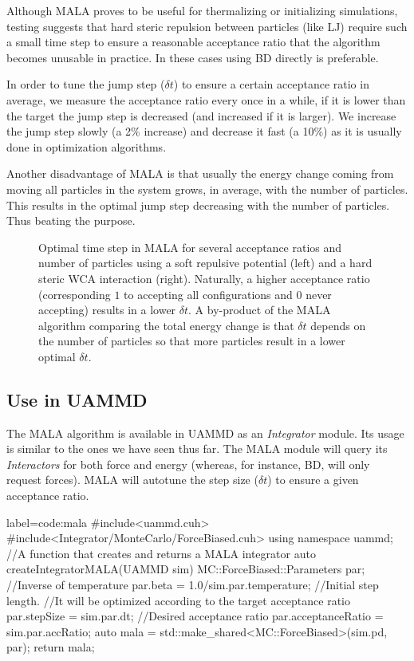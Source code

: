 \documentclass[ twoside,openright,titlepage,numbers=noenddot,%
headinclude,footinclude,cleardoublepage=empty,abstract=on,
BCOR=5mm,paper=a4,fontsize=11pt, dvipsnames
]{scrreprt}
\newcommand{\uammd}{\gls{UAMMD}\xspace}
\newcommand{\dt}{\delta t}
\begin{document}
Although MALA proves to be useful for thermalizing or initializing simulations, testing suggests that hard steric repulsion between particles (like LJ) require such a small time step to ensure a reasonable acceptance ratio that the algorithm becomes unusable in practice. In these cases using \gls{BD} directly is preferable.

In order to tune the jump step ($\dt$) to ensure a certain acceptance ratio in average, we measure the acceptance ratio every once in a while, if it is lower than the target the jump step is decreased (and increased if it is larger). We increase the jump step slowly (a 2\% increase) and decrease it fast (a 10\%) as it is usually done in optimization algorithms.

Another disadvantage of MALA is that usually the energy change coming from moving all particles in the system grows, in average, with the number of particles. This results in the optimal jump step decreasing with the number of particles. Thus beating the purpose.
\begin{figure}[H]
  \label{fig:malastep}
  \centering    
  \label{fig:malastepsoft}
  \label{fig:malasteplj}
  \caption{Optimal time step in MALA for several acceptance ratios and number of particles using a soft repulsive potential (left) and a hard steric WCA interaction (right). Naturally, a higher acceptance ratio (corresponding $1$ to accepting all configurations and $0$ never accepting) results in a lower $\dt$. A by-product of the MALA algorithm comparing the total energy change is that $\dt$ depends on the number of particles so that more particles result in a lower optimal $\dt$.}
\end{figure}

\subsection*{Use in UAMMD}
The MALA algorithm is available in \uammd as an \emph{Integrator} module. Its usage is similar to the ones we have seen thus far. The MALA module will query its \emph{Interactors} for both force and energy (whereas, for instance, \gls{BD}, will only request forces).
MALA will autotune the step size ($\dt$) to ensure a given acceptance ratio.
\begin{code2}{label=code:mala}
#include<uammd.cuh>
#include<Integrator/MonteCarlo/ForceBiased.cuh>
using namespace uammd;
//A function that creates and returns a MALA integrator
auto createIntegratorMALA(UAMMD sim){   
  MC::ForceBiased::Parameters par;
  //Inverse of temperature
  par.beta = 1.0/sim.par.temperature;	
  //Initial step length.
  //It will be optimized according to the target acceptance ratio
  par.stepSize = sim.par.dt;
  //Desired acceptance ratio 
  par.acceptanceRatio = sim.par.accRatio;
  auto mala = std::make_shared<MC::ForceBiased>(sim.pd, par);
  return mala;
}
\end{code2}
\end{document}
